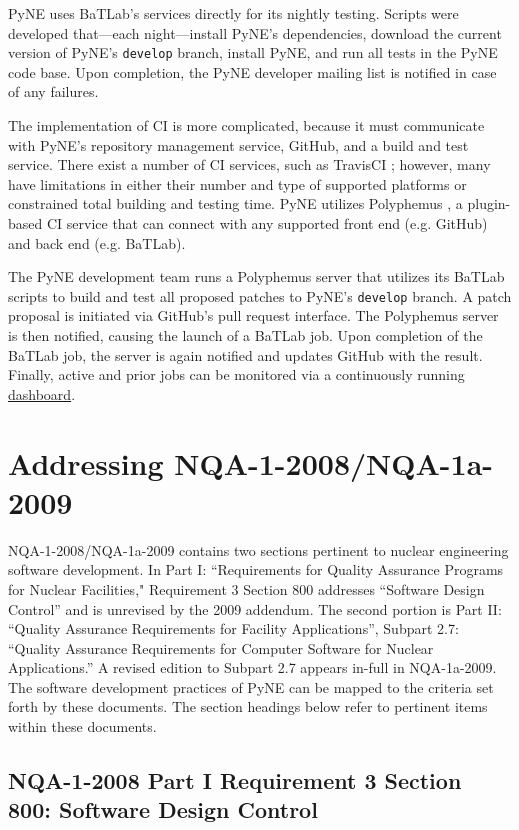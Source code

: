 \documentclass{anstrans}
\begin{document}
PyNE uses BaTLab's services directly for its nightly testing. Scripts were
developed that---each night---install PyNE's dependencies, download the current version
of PyNE's \texttt{develop} branch, install PyNE, and run all tests in the PyNE
code base. Upon completion, the PyNE developer mailing list is notified in case of
any failures.

The implementation of CI is more complicated, because it
must communicate with PyNE's repository management service, GitHub, and a build
and test service. There exist a number of CI services, such as TravisCI
\cite{travis_2014}; however, many have limitations in either their number and
type of supported platforms or constrained total building and testing time. PyNE
utilizes Polyphemus \cite{polyphemus_2014}, a plugin-based CI service that can
connect with any supported front end (e.g. GitHub) and back end (e.g. BaTLab).

The PyNE development team runs a Polyphemus server that utilizes its BaTLab
scripts to build and test all proposed patches to PyNE's \texttt{develop}
branch. A patch proposal is initiated via GitHub's pull request
interface. The Polyphemus server is then notified, causing the launch of a
BaTLab job. Upon completion of the BaTLab job, the server is again notified and
updates GitHub with the result. Finally, active and prior jobs can be monitored
via a continuously running \href{http://gorgus.pyne.io/dashboard}{dashboard}.


\section{Addressing NQA-1-2008/NQA-1a-2009}

NQA-1-2008/NQA-1a-2009 contains two sections pertinent to nuclear engineering
software development. In Part I: ``Requirements for Quality Assurance Programs
for Nuclear Facilities," Requirement 3 Section 800 addresses ``Software Design
Control'' and is unrevised by the 2009 addendum. The second portion is Part II:
``Quality Assurance Requirements for Facility Applications'', Subpart 2.7:
``Quality Assurance Requirements for Computer Software for Nuclear
Applications.'' A revised edition to Subpart 2.7 appears in-full in NQA-1a-2009.
The software development practices of PyNE can be mapped to the criteria set
forth by these documents. The section headings below refer to pertinent items
within these documents.

\subsection{NQA-1-2008 Part I Requirement 3 Section 800: Software Design Control}
\end{document}
